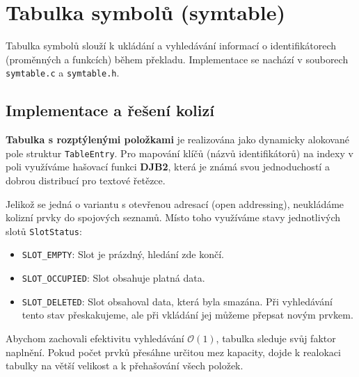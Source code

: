 \section{Tabulka symbolů (symtable)}

Tabulka symbolů slouží k ukládání a vyhledávání informací o identifikátorech (proměnných a funkcích) během překladu. Implementace se nachází v souborech \texttt{symtable.c} a \texttt{symtable.h}.

\subsection*{Implementace a řešení kolizí}

\textbf{Tabulka s rozptýlenými položkami}  je realizována jako dynamicky alokované pole struktur \texttt{TableEntry}. Pro mapování klíčů (názvů identifikátorů) na indexy v poli využíváme hašovací funkci \textbf{DJB2}, která je známá svou jednoduchostí a dobrou distribucí pro textové řetězce.

Jelikož se jedná o variantu s otevřenou adresací (open addressing), neukládáme kolizní prvky do spojových seznamů. Místo toho využíváme stavy jednotlivých slotů  \texttt{SlotStatus}:
\begin{itemize}
    \item \texttt{SLOT\_EMPTY}: Slot je prázdný, hledání zde končí.
    \item \texttt{SLOT\_OCCUPIED}: Slot obsahuje platná data.
    \item \texttt{SLOT\_DELETED}: Slot obsahoval data, která byla smazána. Při vyhledávání tento stav přeskakujeme, ale při vkládání jej můžeme přepsat novým prvkem.
\end{itemize}

Abychom zachovali efektivitu vyhledávání $\mathcal{O}(1)$, tabulka sleduje svůj faktor naplnění. Pokud počet prvků přesáhne určitou mez kapacity, dojde k realokaci tabulky na větší velikost a k přehašování všech položek.


